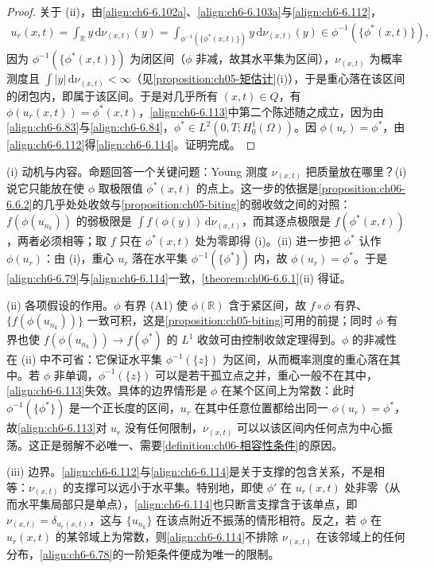 \documentclass[../../main.tex]{subfiles}%
\begin{document}
\begin{proof}
关于 (ii)，由\eqref{align:ch6-6.102a}、\eqref{align:ch6-6.103a}与\eqref{align:ch6-6.112}，
\begin{align*}
u_r(x,t)=\int_\mathbb{R}y\,\mathrm{d}\nu_{(x,t)}(y)
=\int_{\phi^{-1}(\{\phi^*(x,t)\})}y\,\mathrm{d}\nu_{(x,t)}(y)
\in\phi^{-1}(\{\phi^*(x,t)\}),
\end{align*}
因为 $\phi^{-1}(\{\phi^*(x,t)\})$ 为闭区间（$\phi$ 非减，故其水平集为区间），$\nu_{(x,t)}$ 为概率测度且 $\int|y|\,\mathrm{d}\nu_{(x,t)}<\infty$（见\cref{proposition:ch05-矩估计}(i)），于是重心落在该区间的闭包内，即属于该区间。于是对几乎所有 $(x,t)\in Q$，有 $\phi(u_r(x,t))=\phi^*(x,t)$，\eqref{align:ch6-6.113}中第二个陈述随之成立，因为由\eqref{align:ch6-6.83}与\eqref{align:ch6-6.84}，$\phi^*\in L^2(0,T;H^1_0(\Omega))$。因 $\phi(u_r)=\phi^*$，由\eqref{align:ch6-6.112}得\eqref{align:ch6-6.114}。证明完成。
\end{proof}

\begin{remark}\label{remark:ch06-6.6.6}
(i) 动机与内容。命题回答一个关键问题：Young 测度 $\nu_{(x,t)}$ 把质量放在哪里？(i) 说它只能放在使 $\phi$ 取极限值 $\phi^*(x,t)$ 的点上。这一步的依据是\cref{proposition:ch06-6.6.2}的几乎处处收敛与\cref{proposition:ch05-biting}的弱收敛之间的对照：$f(\phi(u_{n_k}))$ 的弱极限是 $\int f(\phi(y))\,\mathrm{d}\nu_{(x,t)}$，而其逐点极限是 $f(\phi^*(x,t))$，两者必须相等；取 $f$ 只在 $\phi^*(x,t)$ 处为零即得 (i)。(ii) 进一步把 $\phi^*$ 认作 $\phi(u_r)$：由 (i)，重心 $u_r$ 落在水平集 $\phi^{-1}(\{\phi^*\})$ 内，故 $\phi(u_r)=\phi^*$。于是\eqref{align:ch6-6.79}与\eqref{align:ch6-6.114}一致，\cref{theorem:ch06-6.6.1}(ii) 得证。

(ii) 各项假设的作用。$\phi$ 有界 (A1) 使 $\phi(\mathbb{R})$ 含于紧区间，故 $f\circ\phi$ 有界、$\{f(\phi(u_{n_k}))\}$ 一致可积，这是\cref{proposition:ch05-biting}可用的前提；同时 $\phi$ 有界也使 $f(\phi(u_{n_k}))\to f(\phi^*)$ 的 $L^1$ 收敛可由控制收敛定理得到。$\phi$ 的非减性在 (ii) 中不可省：它保证水平集 $\phi^{-1}(\{z\})$ 为区间，从而概率测度的重心落在其中。若 $\phi$ 非单调，$\phi^{-1}(\{z\})$ 可以是若干孤立点之并，重心一般不在其中，\eqref{align:ch6-6.113}失效。具体的边界情形是 $\phi$ 在某个区间上为常数：此时 $\phi^{-1}(\{\phi^*\})$ 是一个正长度的区间，$u_r$ 在其中任意位置都给出同一 $\phi(u_r)=\phi^*$，故\eqref{align:ch6-6.113}对 $u_r$ 没有任何限制，$\nu_{(x,t)}$ 可以以该区间内任何点为中心振荡。这正是弱解不必唯一、需要\cref{definition:ch06-相容性条件}的原因。

(iii) 边界。\eqref{align:ch6-6.112}与\eqref{align:ch6-6.114}是关于支撑的包含关系，不是相等：$\nu_{(x,t)}$ 的支撑可以远小于水平集。特别地，即使 $\phi'$ 在 $u_r(x,t)$ 处非零（从而水平集局部只是单点），\eqref{align:ch6-6.114}也只断言支撑含于该单点，即 $\nu_{(x,t)}=\delta_{u_r(x,t)}$，这与 $\{u_{n_k}\}$ 在该点附近不振荡的情形相符。反之，若 $\phi$ 在 $u_r(x,t)$ 的某邻域上为常数，则\eqref{align:ch6-6.114}不排除 $\nu_{(x,t)}$ 在该邻域上的任何分布，\eqref{align:ch6-6.78}的一阶矩条件便成为唯一的限制。
\end{remark}
\end{document}
